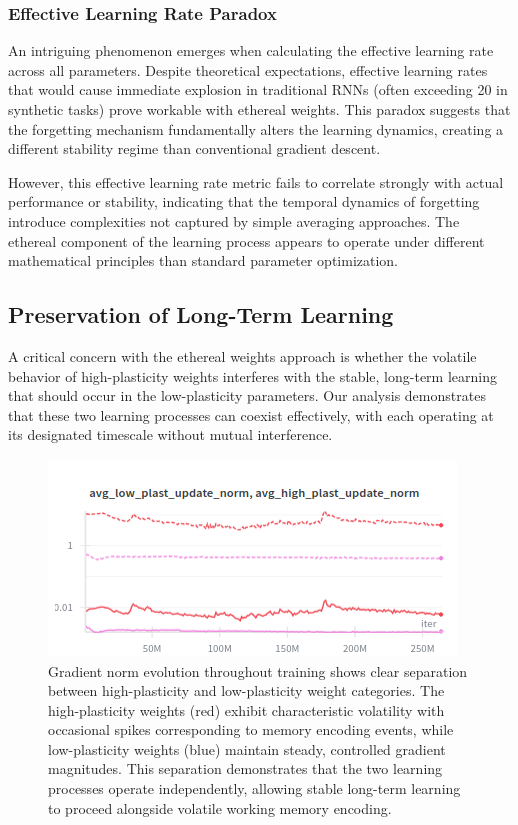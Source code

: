 \documentclass{article} %
\begin{document}
\subsubsection{Effective Learning Rate Paradox}

An intriguing phenomenon emerges when calculating the effective learning rate across all parameters. Despite theoretical expectations, effective learning rates that would cause immediate explosion in traditional RNNs (often exceeding 20 in synthetic tasks) prove workable with ethereal weights. This paradox suggests that the forgetting mechanism fundamentally alters the learning dynamics, creating a different stability regime than conventional gradient descent.

However, this effective learning rate metric fails to correlate strongly with actual performance or stability, indicating that the temporal dynamics of forgetting introduce complexities not captured by simple averaging approaches. The ethereal component of the learning process appears to operate under different mathematical principles than standard parameter optimization.

\subsection{Preservation of Long-Term Learning}

A critical concern with the ethereal weights approach is whether the volatile behavior of high-plasticity weights interferes with the stable, long-term learning that should occur in the low-plasticity parameters. Our analysis demonstrates that these two learning processes can coexist effectively, with each operating at its designated timescale without mutual interference.

\begin{figure}[h]
\begin{center}
\includegraphics[width=0.8\linewidth]{figure_4.png}
\caption{Gradient norm evolution throughout training shows clear separation between high-plasticity and low-plasticity weight categories. The high-plasticity weights (red) exhibit characteristic volatility with occasional spikes corresponding to memory encoding events, while low-plasticity weights (blue) maintain steady, controlled gradient magnitudes. This separation demonstrates that the two learning processes operate independently, allowing stable long-term learning to proceed alongside volatile working memory encoding.}
\label{fig:gradient_norms}
\end{center}
\end{figure}
\end{document}
